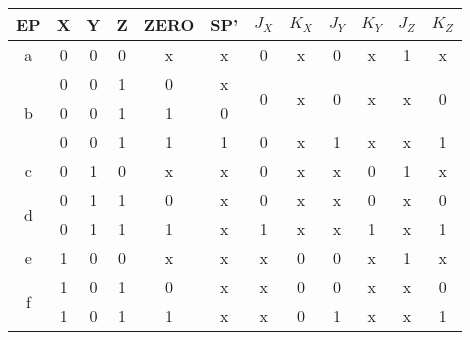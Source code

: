 \begin{table}[H]
  \centering
  \begin{tabular}{c c c c c c c c c c c c}
    \toprule
    EP & X & Y & Z & ZERO & SP' & $J_X$ & $K_X$   & $J_Y$ & $K_Y$   & $J_Z$ & $K_Z$ \\
    \toprule
    a
       & 0 & 0 & 0 & x & x
       & 0 & x %
       & 0 & x %
       & 1 & x %
       \\
    \cmidrule(r){1-6}      \cmidrule(l){7-8} \cmidrule(l){9-10} \cmidrule(l){11-12}
    \multirow{3}{*}{b}
       & 0 & 0 & 1 & 0 & x
       & \multirow{2}{*}{0} & \multirow{2}{*}{x} %
       & \multirow{2}{*}{0} & \multirow{2}{*}{x} %
       & \multirow{2}{*}{x} & \multirow{2}{*}{0} %
       \\
       & 0 & 0 & 1 & 1 & 0 & & & & & &
       \\
    \cmidrule(r){2-6}      \cmidrule(l){7-8} \cmidrule(l){9-10} \cmidrule(l){11-12}
       & 0 & 0 & 1 & 1 & 1
       & 0 & x %
       & 1 & x %
       & x & 1 %
       \\
    \cmidrule(r){1-6}      \cmidrule(l){7-8} \cmidrule(l){9-10} \cmidrule(l){11-12}
    c
       & 0 & 1 & 0 & x & x
       & 0 & x %
       & x & 0 %
       & 1 & x %
       \\
    \cmidrule(r){1-6}      \cmidrule(l){7-8} \cmidrule(l){9-10} \cmidrule(l){11-12}
    \multirow{2}{*}{d}
       & 0 & 1 & 1 & 0 & x
       & 0 & x %
       & x & 0 %
       & x & 0 %
       \\
    \cmidrule(r){2-6}      \cmidrule(l){7-8} \cmidrule(l){9-10} \cmidrule(l){11-12}
       & 0 & 1 & 1 & 1 & x
       & 1 & x %
       & x & 1 %
       & x & 1 %
       \\
    \cmidrule(r){1-6}      \cmidrule(l){7-8} \cmidrule(l){9-10} \cmidrule(l){11-12}
    e
       & 1 & 0 & 0 & x & x
       & x & 0 %
       & 0 & x %
       & 1 & x %
       \\
    \cmidrule(r){1-6}      \cmidrule(l){7-8} \cmidrule(l){9-10} \cmidrule(l){11-12}
    \multirow{2}{*}{f}
       & 1 & 0 & 1 & 0 & x
       & x & 0 %
       & 0 & x %
       & x & 0 %
       \\
    \cmidrule(r){2-6}      \cmidrule(l){7-8} \cmidrule(l){9-10} \cmidrule(l){11-12}
       & 1 & 0 & 1 & 1 & x
       & x & 0 %
       & 1 & x %
       & x & 1 %
       \\
    \cmidrule(r){1-6}      \cmidrule(l){7-8} \cmidrule(l){9-10} \cmidrule(l){11-12}

\end{tabular}
\end{table}
